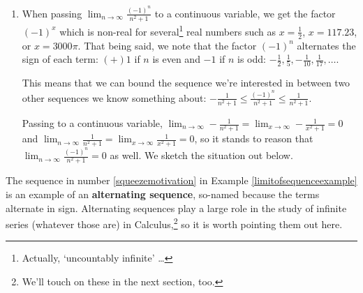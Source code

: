 \documentclass{ximera}
\begin{document}
\begin{example}
\begin{explanation}
\begin{enumerate}
\begin{enumerate}
\begin{center}
\end{center}

\end{enumerate}

\item When passing  $\lim_{n \rightarrow \infty} \frac{(-1)^{n}}{n^2 +1}$ to a continuous variable, we get the factor $(-1)^{x}$ which is non-real for several\footnote{Actually, `uncountably infinite' \ldots} real numbers such as $x = \frac{1}{2}$, $x = 117.23$, or $x = 3000 \pi$.  That being said, we note that the factor $(-1)^{n}$ alternates the sign of each term:  $(+)1$ if $n$ is even and $-1$ if $n$ is odd:  $-\frac{1}{2}, \frac{1}{5}, -\frac{1}{10}, \frac{1}{17}, \ldots$.



This means that we can bound the sequence we're interested in between two other sequences we know something about:  $-\frac{1}{n^2 + 1} \leq \frac{(-1)^{n}}{n^2 +1} \leq \frac{1}{n^2+1}$.



Passing to a continuous variable,  $\lim_{n \rightarrow \infty} -\frac{1}{n^2 +1} = \lim_{x \rightarrow \infty} -\frac{1}{x^2 +1} =0$ and $\lim_{n \rightarrow \infty} \frac{1}{n^2 +1} = \lim_{x \rightarrow \infty} \frac{1}{x^2 +1} =0$, so it stands to reason that $\lim_{n \rightarrow \infty} \frac{(-1)^{n}}{n^2 +1} = 0$ as well.  We sketch the situation out below.

\begin{center}
\end{center}

\end{enumerate}
\end{explanation}


\end{example}



The sequence in number \ref{squeezemotivation} in Example \ref{limitofsequenceexample} is an example of an \textbf{alternating sequence}, so-named because the terms alternate in sign.  Alternating sequences play a large role in the study of infinite series (whatever those are) in Calculus,\footnote{We'll touch on these in the next section, too.}  so it is worth pointing them out here.
\end{document}
